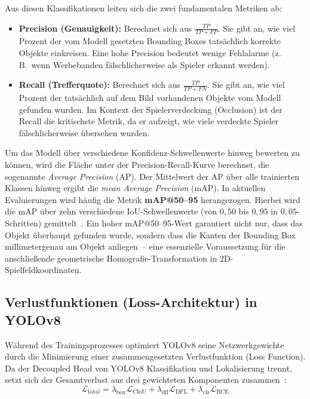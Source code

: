 Aus diesen Klassifikationen leiten sich die zwei fundamentalen Metriken ab:
\begin{itemize}
    \item \textbf{Precision (Genauigkeit):} Berechnet sich aus $\frac{TP}{TP + FP}$. Sie gibt an, wie viel Prozent der vom Modell gesetzten Bounding Boxes tatsächlich korrekte Objekte einkreisen. Eine hohe Precision bedeutet wenige Fehlalarme (z.\,B.\ wenn Werbebanden fälschlicherweise als Spieler erkannt werden).
    \item \textbf{Recall (Trefferquote):} Berechnet sich aus $\frac{TP}{TP + FN}$. Sie gibt an, wie viel Prozent der tatsächlich auf dem Bild vorhandenen Objekte vom Modell gefunden wurden. Im Kontext der Spielerverdeckung (Occlusion) ist der Recall die kritischste Metrik, da er aufzeigt, wie viele verdeckte Spieler fälschlicherweise übersehen wurden.
\end{itemize}

Um das Modell über verschiedene Konfidenz-Schwellenwerte hinweg bewerten zu können, wird die Fläche unter 
der Precision-Recall-Kurve berechnet, die sogenannte \textit{Average Precision} (AP). Der Mittelwert der 
AP über alle trainierten Klassen hinweg ergibt die \textit{mean Average Precision} (mAP). In aktuellen 
Evaluierungen wird häufig die Metrik \textbf{mAP@50--95} herangezogen. Hierbei wird die mAP über zehn 
verschiedene \ac{IoU}-Schwellenwerte (von $0{,}50$ bis $0{,}95$ in $0{,}05$-Schritten) 
gemittelt~\cite{padilla2020survey}. Ein hoher mAP@50--95-Wert garantiert nicht nur, dass das Objekt 
überhaupt gefunden wurde, sondern dass die Kanten der Bounding Box millimetergenau am Objekt anliegen~-- eine 
essenzielle Voraussetzung für die anschließende geometrische Homografie-Transformation in 
2D-Spielfeldkoordinaten.

\subsection{Verlustfunktionen (Loss-Architektur) in YOLOv8}

Während des Trainingsprozesses optimiert YOLOv8 seine Netzwerkgewichte durch die Minimierung einer 
zusammengesetzten Verlustfunktion (Loss Function). Da der Decoupled Head von YOLOv8 Klassifikation und 
Lokalisierung trennt, setzt sich der Gesamtverlust aus drei gewichteten Komponenten 
zusammen~\cite{ultralytics2023yolov8}:
\begin{equation}
    \mathcal{L}_{\text{total}} = \lambda_{\text{box}} \mathcal{L}_{\text{CIoU}} + \lambda_{\text{dfl}} \mathcal{L}_{\text{DFL}} + \lambda_{\text{cls}} \mathcal{L}_{\text{BCE}}
\end{equation}

